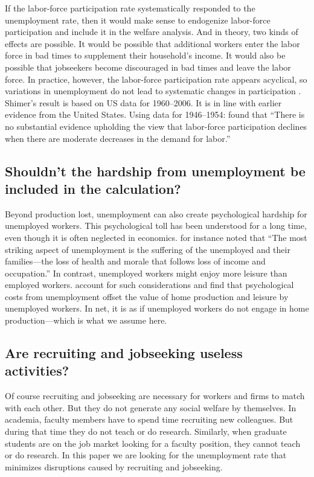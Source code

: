 \documentclass[letterpaper,12pt,leqno]{article}
\begin{document}
If the labor-force participation rate systematically responded to the unemployment rate, then it would make sense to endogenize labor-force participation and include it in the welfare analysis. And in theory, two kinds of effects are possible. It would be possible that additional workers enter the labor force in bad times to supplement their household's income. It would also be possible that jobseekers become discouraged in bad times and leave the labor force. In practice, however, the labor-force participation rate appears acyclical, so variations in unemployment do not lead to systematic changes in participation \citep[p. 294]{S09}. Shimer's result is based on US data for 1960--2006. It is in line with earlier evidence from the United States. Using data for 1946--1954: \citet[p. 32]{R57} found that ``There is no substantial evidence upholding the view that labor-force participation declines when there are moderate decreases in the demand for labor.'' 

\subsection{Shouldn't the hardship from unemployment be included in the calculation?}

Beyond production lost, unemployment can also create psychological hardship for unemployed workers. This psychological toll has been understood for a long time, even though it is often neglected in economics. \citet[p. 11]{R49} for instance noted that ``The most striking aspect of unemployment is the suffering of the unemployed and their families---the loss of health and morale that follows loss of income and occupation.'' In contrast, unemployed workers might enjoy more leisure than employed workers. \citet{MS16} account for such considerations and find that psychological costs from unemployment offset the value of home production and leisure by unemployed workers. In net, it is as if unemployed workers do not engage in home production---which is what we assume here.

\subsection{Are recruiting and jobseeking useless activities?}

Of course recruiting and jobseeking are necessary for workers and firms to match with each other. But they do not generate any social welfare by themselves. In academia, faculty members have to spend time recruiting new colleagues. But during that time they do not teach or do research. Similarly, when graduate students are on the job market looking for a faculty position, they cannot teach or do research. In this paper we are looking for the unemployment rate that minimizes disruptions caused by recruiting and jobseeking.
\end{document}
